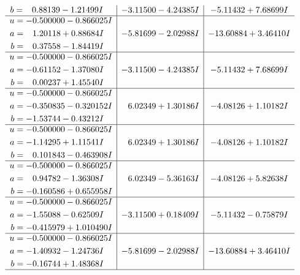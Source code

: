 \documentclass[1p]{elsarticle_modified}
\theoremstyle{definition}
\begin{document}
$$\begin{array}{c|c|c}
\begin{aligned}
b &= \phantom{-}0.88139 - 1.21499 I\end{aligned}
 & -3.11500 - 4.24385 I & -5.11432 + 7.68699 I \\ \hline\begin{aligned}
u &= -0.500000 - 0.866025 I \\
a &= \phantom{-}1.20118 + 0.88684 I \\
b &= \phantom{-}0.37558 - 1.84419 I\end{aligned}
 & -5.81699 - 2.02988 I & -13.60884 + 3.46410 I \\ \hline\begin{aligned}
u &= -0.500000 - 0.866025 I \\
a &= -0.61152 - 1.37080 I \\
b &= \phantom{-}0.00237 + 1.45540 I\end{aligned}
 & -3.11500 - 4.24385 I & -5.11432 + 7.68699 I \\ \hline\begin{aligned}
u &= -0.500000 - 0.866025 I \\
a &= -0.350835 - 0.320152 I \\
b &= -1.53744 - 0.43212 I\end{aligned}
 & \phantom{-}6.02349 + 1.30186 I & -4.08126 + 1.10182 I \\ \hline\begin{aligned}
u &= -0.500000 - 0.866025 I \\
a &= -1.14295 + 1.11541 I \\
b &= \phantom{-}0.101843 - 0.463908 I\end{aligned}
 & \phantom{-}6.02349 + 1.30186 I & -4.08126 + 1.10182 I \\ \hline\begin{aligned}
u &= -0.500000 - 0.866025 I \\
a &= \phantom{-}0.94782 - 1.36308 I \\
b &= -0.160586 + 0.655958 I\end{aligned}
 & \phantom{-}6.02349 - 5.36163 I & -4.08126 + 5.82638 I \\ \hline\begin{aligned}
u &= -0.500000 - 0.866025 I \\
a &= -1.55088 - 0.62509 I \\
b &= -0.415979 + 1.010490 I\end{aligned}
 & -3.11500 + 0.18409 I & -5.11432 - 0.75879 I \\ \hline\begin{aligned}
u &= -0.500000 - 0.866025 I \\
a &= -1.40932 - 1.24736 I \\
b &= -0.16744 + 1.48368 I\end{aligned}
 & -5.81699 - 2.02988 I & -13.60884 + 3.46410 I\\
 \hline 
 \end{array}$$\newpage\newpage\renewcommand{\arraystretch}{1}
\end{document}
